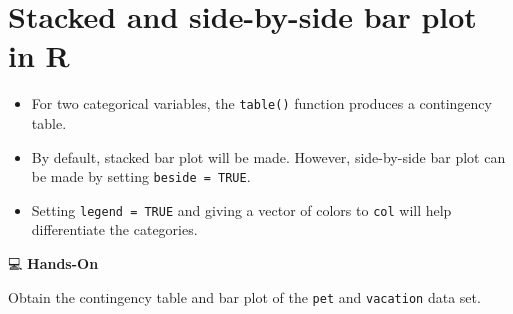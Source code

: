 \documentclass[
  letterpaper,
  DIV=11,
  numbers=noendperiod]{scrreprt}
\begin{document}
\section{Stacked and side-by-side bar plot in
R}\label{stacked-and-side-by-side-bar-plot-in-r}

\begin{itemize}
\item
  For two categorical variables, the \texttt{table()} function produces
  a contingency table.
\item
  By default, stacked bar plot will be made. However, side-by-side bar
  plot can be made by setting \texttt{beside\ =\ TRUE}.
\item
  Setting \texttt{legend\ =\ TRUE} and giving a vector of colors to
  \texttt{col} will help differentiate the categories.
\end{itemize}

💻 \textbf{Hands-On}

Obtain the contingency table and bar plot of the \texttt{pet} and
\texttt{vacation} data set.
\end{document}
